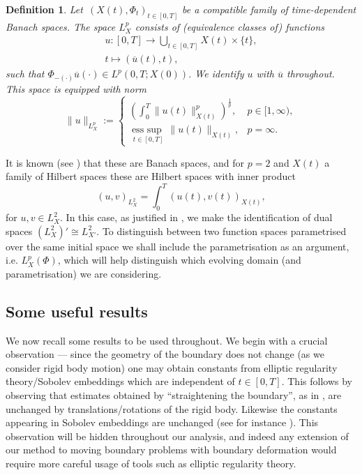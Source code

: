 \documentclass[a4paper]{amsart}
\numberwithin{equation}{section}
\newcommand{\esssup}[1]{\underset{#1}{\operatorname{ess \ sup \ }}}
\theoremstyle{plain}
\newtheorem{definition}[theorem]{Definition}
\newcommand{\mbf}[1]{\mathbf{#1}}
\newcommand{\mbb}[1]{\mathbb{#1}}
\begin{document}
\begin{definition}
    \label{defn: evolving Bochner spaces}
	Let~$(X(t),\Phi_t)_{t \in [0,T]}$ be a compatible family of time-dependent Banach spaces.
	The space $L^p_X$ consists of (equivalence classes of) functions
	\begin{gather*}
		u:[0,T] \rightarrow \bigcup_{t \in [0,T]} X(t) \times \{ t \},\\
		t \mapsto (\overline{u}(t), t),
	\end{gather*}
	such that $ \Phi_{-(\cdot)} \overline{u}(\cdot) \in L^p(0,T;X(0))$.
	We identify $u$ with $\overline{u}$ throughout.
	This space is equipped with norm
	\[\|u\|_{L^p_X} := \begin{cases}
		\left( \int_0^T \|u(t)\|^p_{X(t)} \right)^{\frac{1}{p}}, & p \in [1,\infty),\\
		\esssup{t \in [0,T]}\|u(t)\|_{X(t)}, & p = \infty.
	\end{cases}\]
\end{definition}
It is known (see \cite{alphonse2023function,alphonse2015abstract}) that these are Banach spaces, and for $p=2$ and $X(t)$ a family of Hilbert spaces these are Hilbert spaces with inner product
\[(u,v)_{L^2_X} = \int_0^T (u(t),v(t))_{X(t)},\]
for $u,v \in L^2_X$.
In this case, as justified in \cite{alphonse2015abstract}, we make the identification of dual spaces $(L^2_{X})' \cong L^2_{X'}$.
To distinguish between two function spaces parametrised over the same initial space we shall include the parametrisation as an argument, i.e. $L^p_X(\Phi)$, which will help distinguish which evolving domain (and parametrisation) we are considering.

\subsection{Some useful results}

We now recall some results to be used throughout.
We begin with a crucial observation --- since the geometry of the boundary does not change (as we consider rigid body motion) one may obtain constants from elliptic regularity theory/Sobolev embeddings which are independent of $t \in [0,T]$.
This follows by observing that estimates obtained by ``straightening the boundary'', as in \cite[\S 6.2]{gilbarg1977elliptic}, are unchanged by translations/rotations of the rigid body.
Likewise the constants appearing in Sobolev embeddings are unchanged (see for instance \cite[\S 7.7]{gilbarg1977elliptic}).
This observation will be hidden throughout our analysis, and indeed any extension of our method to moving boundary problems with boundary deformation would require more careful usage of tools such as elliptic regularity theory.
\end{document}
